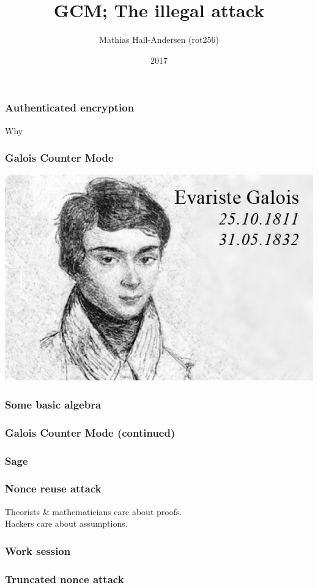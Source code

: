 \documentclass{beamer}
\title{GCM; The illegal attack}
\author{Mathias Hall-Andersen (rot256)}
\institute{Pwnies @ Copenhagen University}
\date{2017}
\begin{document}
\frame{\titlepage}

\begin{frame}
\frametitle{Authenticated encryption}
Why
\end{frame}

\begin{frame}
\frametitle{Galois Counter Mode}
\includegraphics[width=\textwidth]{evariste_galois}
\end{frame}

\begin{frame}
\frametitle{Some basic algebra}
\end{frame}

\begin{frame}
\frametitle{Galois Counter Mode (continued)}
\end{frame}

\begin{frame}
\frametitle{Sage}
\end{frame}

\begin{frame}
\frametitle{Nonce reuse attack}
Theorists \& mathematicians care about proofs. \\
Hackers care about assumptions.
\end{frame}

\begin{frame}
\frametitle{Work session}
\end{frame}

\begin{frame}
\frametitle{Truncated nonce attack}
\end{frame}
\end{document}
